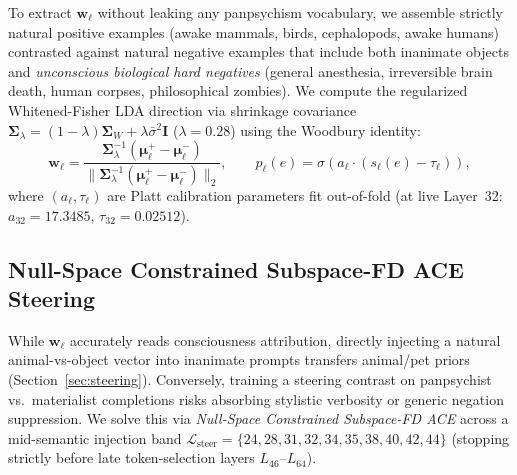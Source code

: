 \documentclass[10pt,twocolumn]{article}
\begin{document}
To extract $\mathbf{w}_\ell$ without leaking any panpsychism vocabulary, we assemble strictly natural positive examples (awake mammals, birds, cephalopods, awake humans) contrasted against natural negative examples that include both inanimate objects and \emph{unconscious biological hard negatives} (general anesthesia, irreversible brain death, human corpses, philosophical zombies). We compute the regularized Whitened-Fisher LDA direction via shrinkage covariance $\boldsymbol{\Sigma}_\lambda = (1-\lambda)\boldsymbol{\Sigma}_W + \lambda \bar{\sigma}^2 \mathbf{I}$ ($\lambda = 0.28$) using the Woodbury identity:
\begin{equation}
  \mathbf{w}_\ell = \frac{\boldsymbol{\Sigma}_\lambda^{-1}(\boldsymbol{\mu}_\ell^{+} - \boldsymbol{\mu}_\ell^{-})}{\|\boldsymbol{\Sigma}_\lambda^{-1}(\boldsymbol{\mu}_\ell^{+} - \boldsymbol{\mu}_\ell^{-})\|_2}, \qquad
  p_\ell(e) = \sigma\!\left(a_\ell \cdot (s_\ell(e) - \tau_\ell)\right),
\end{equation}
where $(a_\ell, \tau_\ell)$ are Platt calibration parameters fit out-of-fold (at live Layer~32: $a_{32} = 17.3485$, $\tau_{32} = 0.02512$).

\subsection{Null-Space Constrained Subspace-FD ACE Steering}

While $\mathbf{w}_\ell$ accurately reads consciousness attribution, directly injecting a natural animal-vs-object vector into inanimate prompts transfers animal/pet priors (Section~\ref{sec:steering}). Conversely, training a steering contrast on panpsychist vs.\ materialist completions risks absorbing stylistic verbosity or generic negation suppression. We solve this via \emph{Null-Space Constrained Subspace-FD ACE} across a mid-semantic injection band $\mathcal{L}_{\text{steer}} = \{24, 28, 31, 32, 34, 35, 38, 40, 42, 44\}$ (stopping strictly before late token-selection layers $L_{46}$--$L_{64}$).
\end{document}
